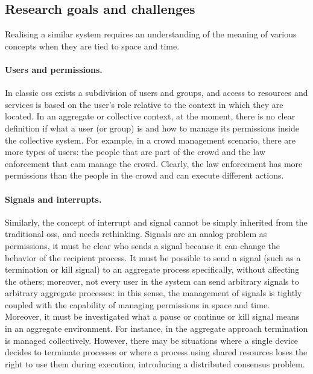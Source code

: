 \documentclass[12pt, a4paper]{article}
\begin{document}
\subsection{Research goals and challenges}
\label{subsec:research-goals-and-challenges}

Realising a similar system requires an understanding of the meaning of various concepts when they are tied to space and time.

\paragraph{Users and permissions.}
In classic \acp{os} exists a subdivision of users and groups,
and access to resources and services is based on the user's role relative to the context in which they are located.
%
In an aggregate or collective context,
at the moment,
there is no clear definition if what a user (or group) is and how to manage its permissions inside the collective system.
%
For example,
in a crowd management scenario,
there are more types of users: the people that are part of the crowd and the law enforcement that cam manage the crowd.
%
Clearly,
the law enforcement has more permissions than the people in the crowd and can execute different actions.
%

\paragraph{Signals and interrupts.}
Similarly, the concept of interrupt and signal cannot be simply inherited from the traditional \acp{os},
and needs rethinking.
%
Signals are an analog problem as permissions, it must be clear who sends a signal because it can
change the behavior of the recipient process.
%
It must be possible to send a signal (such as a termination or kill signal) to an aggregate process specifically,
without affecting the others;
moreover,
not every user in the system can send arbitrary signals to arbitrary aggregate processes:
in this sense,
the management of signals is tightly coupled with the capability of managing permissions in space and time.
%
Moreover,
it must be investigated what a pause or continue or kill signal means in an aggregate environment.
%
For instance,
in the aggregate approach termination is managed collectively.
%
However,
there may be situations where a single device decides to terminate processes or where a process using shared
resources loses the right to use them during execution,
introducing a distributed consensus problem.
\end{document}
